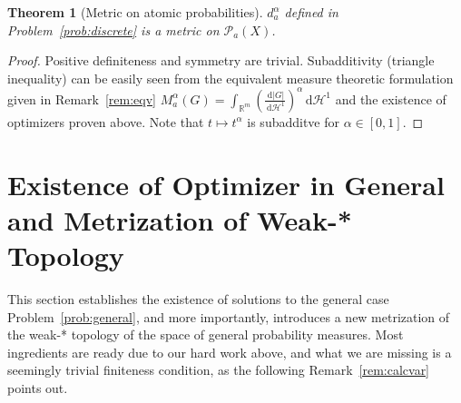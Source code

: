 \documentclass[fleqn]{article}
\newtheorem{thm}{Theorem}[section]
\theoremstyle{definition}
\theoremstyle{remark}
\renewcommand{\d}{\,\mathrm{d}} %
\renewcommand{\P}{\mathcal{P}} %
\renewcommand{\H}{\mathcal{H}^1} %
\begin{document}
\begin{thm}[Metric on atomic probabilities]
$d_a^\alpha$ defined in Problem~\ref{prob:discrete} is a metric on $\P_a(X)$.
\end{thm}

\begin{proof}
Positive definiteness and symmetry are trivial. Subadditivity (triangle inequality) can be easily seen from the equivalent measure theoretic formulation given in Remark~\ref{rem:eqv} $M_a^\alpha(G)=\int_{\mathbb{R}^m} \left(\frac{\d|G|}{\d\H}\right)^{\alpha} \d\H$ and the existence of optimizers proven above. Note that $t\mapsto t^\alpha$ is subadditve for $\alpha\in[0,1]$.
\end{proof}

\section{Existence of Optimizer in General and Metrization of Weak-* Topology} \label{sec:general}
This section establishes the existence of solutions to the general case Problem~\ref{prob:general}, and more importantly, introduces a new metrization of the weak-* topology of the space of general probability measures. Most ingredients are ready due to our hard work above, and what we are missing is a seemingly trivial finiteness condition, as the following Remark~\ref{rem:calcvar} points out. 
\end{document}

